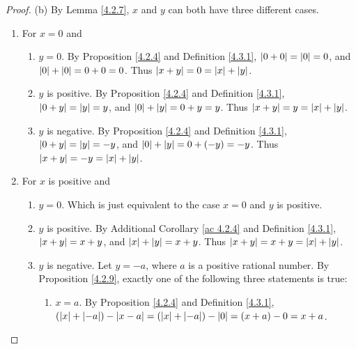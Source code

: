 \begin{proof}{(b)}
    By Lemma \ref{4.2.7}, \(x\) and \(y\) can both have three different cases.
    \begin{enumerate}[label=(\Roman*)]
        \item For \(x = 0\) and
              \begin{enumerate}[label=(\roman*)]
                  \item \(y = 0\).
                        By Proposition \ref{4.2.4} and Definition \ref{4.3.1}, \(\abs*{0 + 0} = \abs*{0} = 0\), and \(\abs*{0} + \abs*{0} = 0 + 0 = 0\).
                        Thus \(\abs*{x + y} = 0 = \abs*{x} + \abs*{y}\).
                  \item \(y\) is positive.
                        By Proposition \ref{4.2.4} and Definition \ref{4.3.1}, \(\abs*{0 + y} = \abs*{y} = y\), and \(\abs*{0} + \abs*{y} = 0 + y = y\).
                        Thus \(\abs*{x + y} = y = \abs*{x} + \abs*{y}\).
                  \item \(y\) is negative.
                        By Proposition \ref{4.2.4} and Definition \ref{4.3.1}, \(\abs*{0 + y} = \abs*{y} = -y\), and \(\abs*{0} + \abs*{y} = 0 + (-y) = -y\).
                        Thus \(\abs*{x + y} = -y = \abs*{x} + \abs*{y}\).
              \end{enumerate}
        \item For \(x\) is positive and
              \begin{enumerate}[label=(\roman*)]
                  \item \(y = 0\).
                        Which is just equivalent to the case \(x = 0\) and \(y\) is positive.
                  \item \(y\) is positive.
                        By Additional Corollary \ref{ac 4.2.4} and Definition \ref{4.3.1}, \(\abs*{x + y} = x + y\), and \(\abs*{x} + \abs*{y} = x + y\).
                        Thus \(\abs*{x + y} = x + y = \abs*{x} + \abs*{y}\).
                  \item \(y\) is negative.
                        Let \(y = -a\), where \(a\) is a positive rational number.
                        By Proposition \ref{4.2.9}, exactly one of the following three statements is true:
                        \begin{enumerate}[label=(\arabic*)]
                            \item \(x = a\).
                                  By Proposition \ref{4.2.4} and Definition \ref{4.3.1}, \((\abs*{x} + \abs*{-a}) - \abs*{x - a} = (\abs*{x} + \abs*{-a}) - \abs*{0} = (x + a) - 0 = x + a\).

\end{enumerate}
\end{enumerate}
\end{enumerate}
\end{proof}
